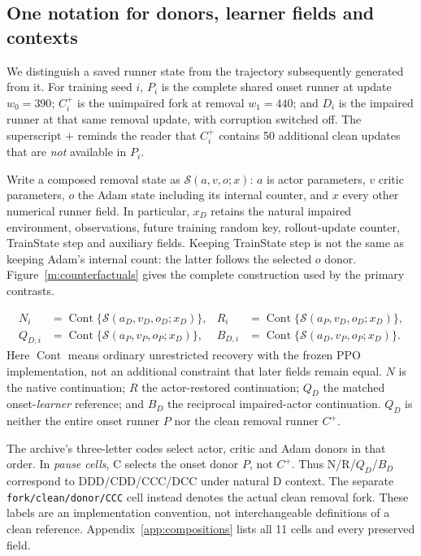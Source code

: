 \subsection{One notation for donors, learner fields and contexts}\label{m:states}
We distinguish a saved runner state from the trajectory subsequently generated from it. For training seed $i$, $P_i$ is the complete shared onset runner at update $w_0=390$; $C_i^{+}$ is the unimpaired fork at removal $w_1=440$; and $D_i$ is the impaired runner at that same removal update, with corruption switched off. The superscript $+$ reminds the reader that $C_i^{+}$ contains 50 additional clean updates that are \emph{not} available in $P_i$.

Write a composed removal state as $\mathcal S(a,v,o;x)$: $a$ is actor parameters, $v$ critic parameters, $o$ the Adam state including its internal counter, and $x$ every other numerical runner field. In particular, $x_D$ retains the natural impaired environment, observations, future training random key, rollout-update counter, TrainState step and auxiliary fields. Keeping TrainState step is not the same as keeping Adam's internal count: the latter follows the selected $o$ donor. Figure~\ref{m:counterfactuals} gives the complete construction used by the primary contrasts.

\begin{align}
N_i &= \operatorname{Cont}\{\mathcal S(a_D,v_D,o_D;x_D)\}, &
R_i &= \operatorname{Cont}\{\mathcal S(a_P,v_D,o_D;x_D)\},\\
Q_{D,i} &= \operatorname{Cont}\{\mathcal S(a_P,v_P,o_P;x_D)\}, &
B_{D,i} &= \operatorname{Cont}\{\mathcal S(a_D,v_P,o_P;x_D)\}.
\end{align}
Here $\operatorname{Cont}$ means ordinary unrestricted recovery with the frozen PPO implementation, not an additional constraint that later fields remain equal. $N$ is the native continuation; $R$ the actor-restored continuation; $Q_D$ the matched onset-\emph{learner} reference; and $B_D$ the reciprocal impaired-actor continuation. $Q_D$ is neither the entire onset runner $P$ nor the clean removal runner $C^{+}$.

The archive's three-letter codes select actor, critic and Adam donors in that order. In \emph{pause cells}, C selects the onset donor $P$, not $C^{+}$. Thus N/R/$Q_D$/$B_D$ correspond to DDD/CDD/CCC/DCC under natural D context. The separate \texttt{fork/clean/donor/CCC} cell instead denotes the actual clean removal fork. These labels are an implementation convention, not interchangeable definitions of a clean reference. Appendix~\ref{app:compositions} lists all 11 cells and every preserved field.

